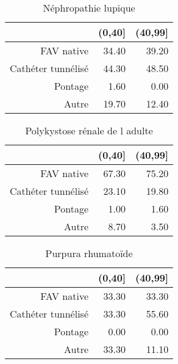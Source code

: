 \documentclass[11pt,a4paper]{article}\usepackage[]{graphicx}\usepackage[]{color}
\begin{document}
\begin{multicols}{2}
\begin{table}[H]
\centering
\begin{tabular}{rrr}
  \hline
 & (0,40] & (40,99] \\ 
  \hline
FAV native & 34.40 & 39.20 \\ 
  Cathéter tunnélisé & 44.30 & 48.50 \\ 
  Pontage & 1.60 & 0.00 \\ 
  Autre & 19.70 & 12.40 \\ 
   \hline
\end{tabular}
\caption{Néphropathie lupique} 
\end{table}
\begin{table}[H]
\centering
\begin{tabular}{rrr}
  \hline
 & (0,40] & (40,99] \\ 
  \hline
FAV native & 67.30 & 75.20 \\ 
  Cathéter tunnélisé & 23.10 & 19.80 \\ 
  Pontage & 1.00 & 1.60 \\ 
  Autre & 8.70 & 3.50 \\ 
   \hline
\end{tabular}
\caption{Polykystose rénale de l adulte} 
\end{table}
\begin{table}[H]
\centering
\begin{tabular}{rrr}
  \hline
 & (0,40] & (40,99] \\ 
  \hline
FAV native & 33.30 & 33.30 \\ 
  Cathéter tunnélisé & 33.30 & 55.60 \\ 
  Pontage & 0.00 & 0.00 \\ 
  Autre & 33.30 & 11.10 \\ 
   \hline
\end{tabular}
\caption{Purpura rhumatoïde} 
\end{table}

\end{multicols}
\end{document}
